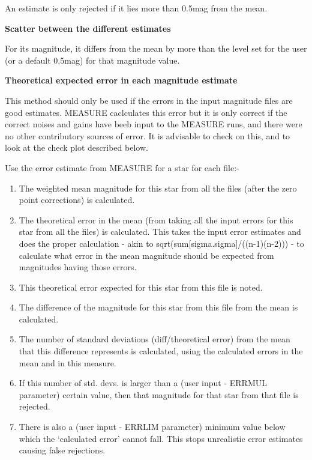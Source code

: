 \begin{small}
{{\begin{list}{{---}}{}
      An estimate is only rejected if it lies more than 0.5mag from the
      mean.

  \item {\bf Scatter between the different estimates}

      For its magnitude, it differs from the mean by more than the
      level set for the user (or a default 0.5mag) for that magnitude
      value.

  \item {\bf Theoretical expected error in each magnitude estimate}

      This method should only be used if the errors in the input
      magnitude files are good estimates. MEASURE caclculates this
      error but it is only correct if the correct noises and gains
      have beeb input to the MEASURE runs, and there were no other
      contributory sources of error. It is advisable to check on
      this, and to look at the check plot described below.

      Use the error estimate from MEASURE for a star for each file:-

      \begin{enumerate}
      \item The weighted mean magnitude for this star from all the files
         (after the zero point corrections) is calculated.
      \item The theoretical error in the mean (from taking all the input
         errors for this star from all the files) is calculated. This
         takes the input error estimates and does the proper
         calculation - akin to sqrt(sum[sigma.sigma]/((n-1)(n-2))) - to
         calculate what error in the mean magnitude should be expected
         from magnitudes having those errors.
      \item This theoretical error expected for this star from this file
         is noted.
      \item The difference of the magnitude for this star from this file
         from the mean is calculated.
      \item The number of standard deviations (diff/theoretical error)
         from the mean that this difference represents is calculated,
         using the calculated errors in the mean and in this measure.
      \item If this number of std. devs. is larger than a (user input -
         ERRMUL parameter) certain value, then that magnitude for that
         star from that file is rejected.
      \item There is also a (user input - ERRLIM parameter) minimum value
         below which the `calculated error' cannot fall. This stops
         unrealistic error estimates causing false rejections.
      \end{enumerate}


\end{list}}}
\end{small}
